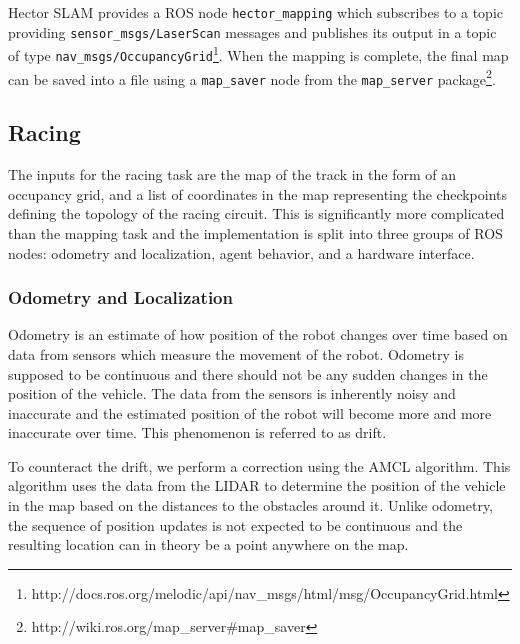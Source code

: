 Hector SLAM provides a \gls*{ROS} node \verb|hector_mapping| which subscribes to a topic providing \verb|sensor_msgs/LaserScan| messages and publishes its output in a topic of type \verb|nav_msgs/OccupancyGrid|\footnote{http://docs.ros.org/melodic/api/nav\_msgs/html/msg/OccupancyGrid.html}. When the mapping is complete, the final map can be saved into a file using a \verb|map_saver| node from the \verb|map_server| package\footnote{http://wiki.ros.org/map\_server\#map\_saver}.

\subsection{Racing}

The inputs for the racing task are the map of the track in the form of an occupancy grid, and a list of coordinates in the map representing the checkpoints defining the topology of the racing circuit. This is significantly more complicated than the mapping task and the implementation is split into three groups of \gls*{ROS} nodes: odometry and localization, agent behavior, and a hardware interface.

\subsubsection{Odometry and Localization}

Odometry is an estimate of how position of the robot changes over time based on data from sensors which measure the movement of the robot. Odometry is supposed to be continuous and there should not be any sudden changes in the position of the vehicle. The data from the sensors is inherently noisy and inaccurate and the estimated position of the robot will become more and more inaccurate over time. This phenomenon is referred to as drift.

To counteract the drift, we perform a correction using the \gls*{AMCL} algorithm. This algorithm uses the data from the \gls*{LIDAR} to determine the position of the vehicle in the map based on the distances to the obstacles around it. Unlike odometry, the sequence of position updates is not expected to be continuous and the resulting location can in theory be a point anywhere on the map.


